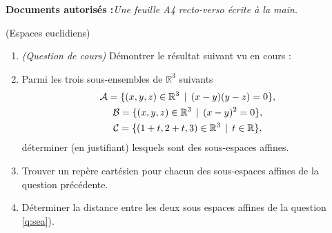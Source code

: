 \documentclass[a4paper,12pt,reqno]{amsart}
\begin{document}
\ifsolutions\else
\textbf{Documents autorisés :}\textit{Une feuille A4 recto-verso écrite à la main.}

\vspace{28mm}
\fi

\begin{exo} (Espaces euclidiens)

  \begin{enumerate}
    \item \emph{(Question de cours)} Démontrer le résultat suivant vu en cours :

    \vspace{7pt}
    \vspace{7pt}

    \item\label{q:sea} Parmi les trois sous-ensembles de $\mathbb{R}^{3}$ suivants
    \begin{gather*}
      \mathcal{A} = \{ (x,y,z) \in \mathbb{R}^{3} \,\mid\, (x-y)(y-z) = 0 \},\\
      \mathcal{B} = \{ (x,y,z) \in \mathbb{R}^{3} \,\mid\, (x-y)^{2} = 0 \},\\
      \mathcal{C} = \{ (1+t,2+t,3) \in \mathbb{R}^{3} \,\mid\, t \in \mathbb{R} \},
    \end{gather*}
    déterminer (en justifiant) lesquels sont des sous-espaces affines.
    \item Trouver un repère cartésien pour chacun des sous-espaces affines de la question précédente.
    \item Déterminer la distance entre les deux sous espaces affines de la question \ref{q:sea}).
   \end{enumerate}

\end{exo}
\end{document}
